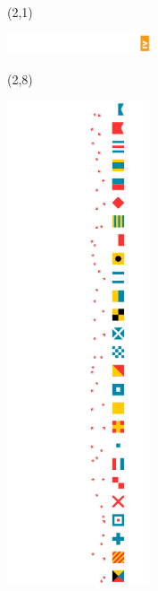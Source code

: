\documentclass{extarticle}
\begin{document}
\pagecolor{black}
\pagestyle{empty}


\begin{textblock}{42}(2,1)
\vfill
{\centerline{\includegraphics[height=6mm]{tools/images/logo-navic-4.pdf}}} 
\vfill
\end{textblock}

\begin{textblock}{42}(2,8)
\vfill
{\centerline{\includegraphics[width=42mm]{tools/main.pdf}}} 
\vfill
\end{textblock}
\end{document}
